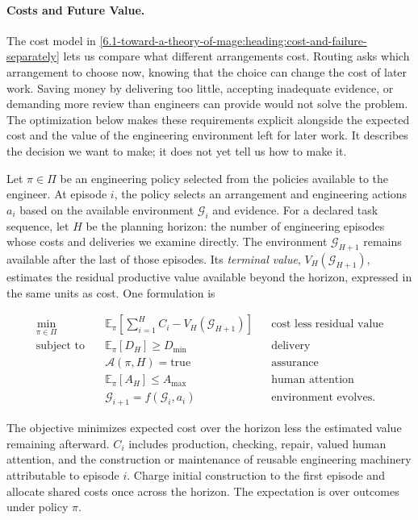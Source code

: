 \paragraph{Costs and Future Value.}

The cost model in \autoref{6.1-toward-a-theory-of-mage:heading:cost-and-failure-separately} lets us compare what different arrangements cost. Routing asks which arrangement to choose now, knowing that the choice can change the cost of later work. Saving money by delivering too little, accepting inadequate evidence, or demanding more review than engineers can provide would not solve the problem. The optimization below makes these requirements explicit alongside the expected cost and the value of the engineering environment left for later work. It describes the decision we want to make; it does not yet tell us how to make it.

Let \(\pi\in\Pi\) be an engineering policy selected from the policies available to the engineer. At episode \(i\), the policy selects an arrangement and engineering actions \(a_i\) based on the available environment \(\mathcal{G}_i\) and evidence. For a declared task sequence, let \(H\) be the planning horizon: the number of engineering episodes whose costs and deliveries we examine directly. The environment \(\mathcal{G}_{H+1}\) remains available after the last of those episodes. Its \emph{terminal value}, \(V_H(\mathcal{G}_{H+1})\), estimates the residual productive value available beyond the horizon, expressed in the same units as cost. One formulation is

\[
\begin{aligned}
\min_{\pi\in\Pi}\quad& \mathbb{E}_{\pi}\left[\sum_{i=1}^{H} C_i-V_H(\mathcal{G}_{H+1})\right]
&&\text{cost less residual value}\\
\text{subject to}\quad& \mathbb{E}_{\pi}[D_H]\ge D_{\min}
&&\text{delivery}\\
& \mathcal{A}(\pi,H)=\mathrm{true}
&&\text{assurance}\\
& \mathbb{E}_{\pi}[A_H]\le A_{\max}
&&\text{human attention}\\
& \mathcal{G}_{i+1}=f(\mathcal{G}_i,a_i)
&&\text{environment evolves}.
\end{aligned}
\]

The objective minimizes expected cost over the horizon less the estimated value remaining afterward. \(C_i\) includes production, checking, repair, valued human attention, and the construction or maintenance of reusable engineering machinery attributable to episode \(i\). Charge initial construction to the first episode and allocate shared costs once across the horizon. The expectation is over outcomes under policy \(\pi\).

